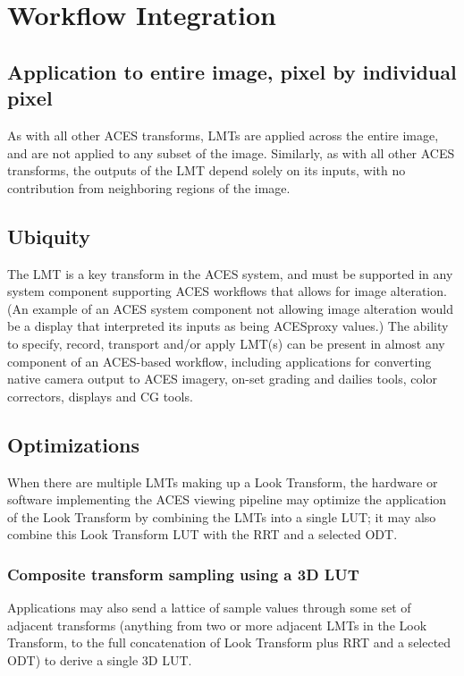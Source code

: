 \regularsectionformat	%
\chapter{Workflow Integration}

\section{Application to entire image, pixel by individual pixel}
As with all other ACES transforms, LMTs are applied across the entire image, and are not applied to any subset of the image. Similarly, as with all other ACES transforms, the outputs of the LMT depend solely on its inputs, with no contribution from neighboring regions of the image.

\section{Ubiquity}
The LMT is a key transform in the ACES system, and must be supported in any system component supporting ACES workflows that allows for image alteration. (An example of an ACES system component not allowing image alteration would be a display that interpreted its inputs as being ACESproxy values.) The ability to specify, record, transport and/or apply LMT(s) can be present in almost any component of an ACES-based workflow, including applications for converting native camera output to ACES imagery, on-set grading and dailies tools, color correctors, displays and CG tools.

\section{Optimizations}
When there are multiple LMTs making up a Look Transform, the hardware or software implementing the ACES viewing pipeline may optimize the application of the Look Transform by combining the LMTs into a single LUT; it may also combine this Look Transform LUT with the RRT and a selected ODT.

\subsection{Composite transform sampling using a 3D LUT}
Applications may also send a lattice of sample values through some set of adjacent transforms (anything from two or more adjacent LMTs in the Look Transform, to the full concatenation of Look Transform plus RRT and a selected ODT) to derive a single 3D LUT.

